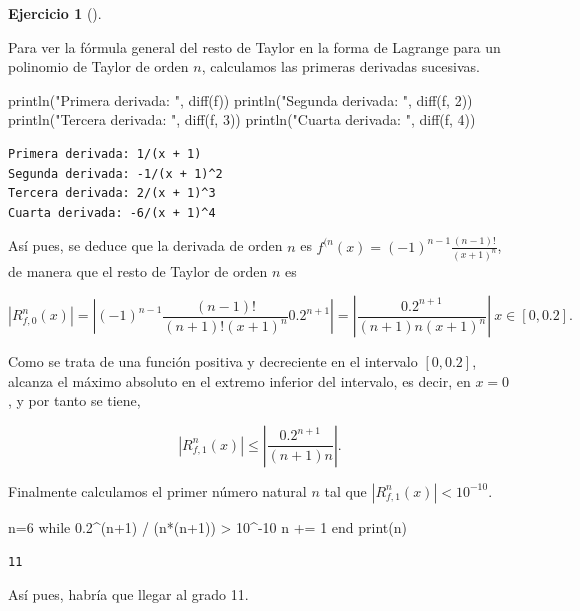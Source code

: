 \documentclass[
  a4paper,
]{scrreport}
\newenvironment{Shaded}{\begin{snugshade}}{\end{snugshade}}
\newcommand{\ControlFlowTok}[1]{\textcolor[rgb]{0.00,0.23,0.31}{#1}}
\newcommand{\FloatTok}[1]{\textcolor[rgb]{0.68,0.00,0.00}{#1}}
\newcommand{\FunctionTok}[1]{\textcolor[rgb]{0.28,0.35,0.67}{#1}}
\newcommand{\NormalTok}[1]{\textcolor[rgb]{0.00,0.23,0.31}{#1}}
\newcommand{\OperatorTok}[1]{\textcolor[rgb]{0.37,0.37,0.37}{#1}}
\newcommand{\StringTok}[1]{\textcolor[rgb]{0.13,0.47,0.30}{#1}}
\theoremstyle{definition}
\newtheorem{exercise}{Ejercicio}[chapter]
\theoremstyle{remark}
\begin{document}
\begin{exercise}[]
\begin{tcolorbox}
Para ver la fórmula general del resto de Taylor en la forma de Lagrange
para un polinomio de Taylor de orden \(n\), calculamos las primeras
derivadas sucesivas.

\begin{Shaded}
\begin{Highlighting}[]
\FunctionTok{println}\NormalTok{(}\StringTok{"Primera derivada: "}\NormalTok{, }\FunctionTok{diff}\NormalTok{(f))}
\FunctionTok{println}\NormalTok{(}\StringTok{"Segunda derivada: "}\NormalTok{, }\FunctionTok{diff}\NormalTok{(f, }\FloatTok{2}\NormalTok{))}
\FunctionTok{println}\NormalTok{(}\StringTok{"Tercera derivada: "}\NormalTok{, }\FunctionTok{diff}\NormalTok{(f, }\FloatTok{3}\NormalTok{))}
\FunctionTok{println}\NormalTok{(}\StringTok{"Cuarta derivada: "}\NormalTok{, }\FunctionTok{diff}\NormalTok{(f, }\FloatTok{4}\NormalTok{))}
\end{Highlighting}
\end{Shaded}

\begin{verbatim}
Primera derivada: 1/(x + 1)
Segunda derivada: -1/(x + 1)^2
Tercera derivada: 2/(x + 1)^3
Cuarta derivada: -6/(x + 1)^4
\end{verbatim}

Así pues, se deduce que la derivada de orden \(n\) es
\(f^{(n}(x)=(-1)^{n-1}\frac{(n-1)!}{(x+1)^n}\), de manera que el resto
de Taylor de orden \(n\) es

\[
|R^n_{f,0}(x)| = \left|(-1)^{n-1}\frac{(n-1)!}{(n+1)!(x+1)^n}0.2^{n+1}\right| = \left|\frac{0.2^{n+1}}{(n+1)n(x+1)^n}\right|\ x\in [0,0.2].
\]

Como se trata de una función positiva y decreciente en el intervalo
\([0,0.2]\), alcanza el máximo absoluto en el extremo inferior del
intervalo, es decir, en \(x=0\), y por tanto se tiene,

\[
|R^n_{f,1}(x)| \leq \left|\frac{0.2^{n+1}}{(n+1)n}\right|.
\]

Finalmente calculamos el primer número natural \(n\) tal que
\(|R^n_{f,1}(x)|<10^{-10}\).

\begin{Shaded}
\begin{Highlighting}[]
\NormalTok{n}\OperatorTok{=}\FloatTok{6}
\ControlFlowTok{while} \FloatTok{0.2}\OperatorTok{\^{}}\NormalTok{(n}\OperatorTok{+}\FloatTok{1}\NormalTok{) }\OperatorTok{/}\NormalTok{ (}\FunctionTok{n*}\NormalTok{(n}\OperatorTok{+}\FloatTok{1}\NormalTok{)) }\OperatorTok{\textgreater{}} \FloatTok{10}\OperatorTok{\^{}{-}}\FloatTok{10}
\NormalTok{    n }\OperatorTok{+=} \FloatTok{1}
\ControlFlowTok{end}
\FunctionTok{print}\NormalTok{(n)}
\end{Highlighting}
\end{Shaded}

\begin{verbatim}
11
\end{verbatim}

Así pues, habría que llegar al grado 11.

\end{tcolorbox}

\end{exercise}
\end{document}
